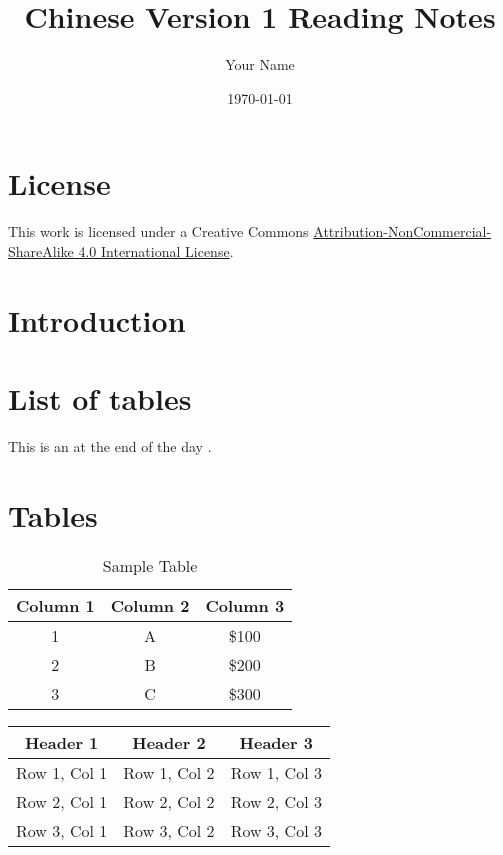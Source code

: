\documentclass[12pt,a4paper]{article}
\begin{document}
\begin{CJK*}{UTF8}{gbsn} %

\title{Chinese Version 1 Reading Notes}
\author{Your Name}
\date{\today}
\maketitle



\section{License}
This work is licensed under a Creative Commons \href{https://creativecommons.org/licenses/by-nc-sa/4.0/}{Attribution-NonCommercial-ShareAlike 4.0 International License}.

\section{Introduction}



\section{List of tables}

\listoffigures    %

\listoftables  %

This is an  at the end of the day .


\section{Tables}
\begin{table}[ht]
    \centering
    \caption{Sample Table}
    \label{tab:sample}
    \begin{tabular}{|c|c|c|}
        \hline
        \textbf{Column 1} & \textbf{Column 2} & \textbf{Column 3} \\
        \hline
        1 & A & \$100 \\
        \hline
        2 & B & \$200 \\
        3 & C & \$300 \\
        \hline
    \end{tabular}
\end{table}

\begin{minipage}{\linewidth}
\begin{tabular}{|c|c|c|}
    \hline
    \textbf{Header 1} & \textbf{Header 2} & \textbf{Header 3} \\
    \hline
    Row 1, Col 1 & Row 1, Col 2 & Row 1, Col 3 \\
    \hline
    Row 2, Col 1 & Row 2, Col 2 & Row 2, Col 3 \\
    \hline
    Row 3, Col 1 & Row 3, Col 2 & Row 3, Col 3 \\
    \hline
\end{tabular}
\end{minipage}


\end{CJK*}
\end{document}
